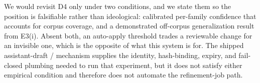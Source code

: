  We would revisit D4 only under two
conditions, and we state them so the position is falsifiable rather than
ideological: calibrated per-family confidence that accounts for corpus coverage, and
a demonstrated off-corpus generalization result from E3(i). Absent both, an
auto-apply threshold trades a reviewable change for an invisible one, which is the
opposite of what this system is for. The shipped assistant-draft
/ mechanism supplies the identity,
hash-binding, expiry, and fail-closed plumbing needed to run that experiment, but it
does not satisfy either empirical condition and therefore does not automate the
refinement-job  path.
